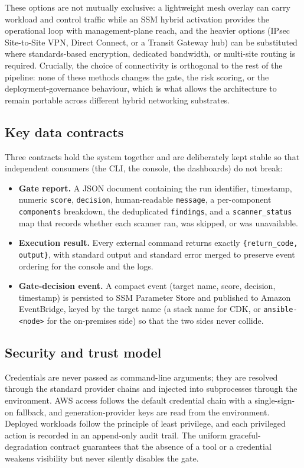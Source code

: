 These options are not mutually exclusive: a lightweight mesh overlay can carry workload
and control traffic while an SSM hybrid activation provides the operational loop with
management-plane reach, and the heavier options (IPsec Site-to-Site VPN, Direct Connect,
or a Transit Gateway hub) can be substituted where standards-based encryption, dedicated
bandwidth, or multi-site routing is required. Crucially, the choice of connectivity is
orthogonal to the rest of the pipeline: none of these methods changes the gate, the risk
scoring, or the deployment-governance behaviour, which is what allows the architecture to
remain portable across different hybrid networking substrates.

\subsection{Key data contracts}
\label{subsec:arch-contracts}

Three contracts hold the system together and are deliberately kept stable so that
independent consumers (the CLI, the console, the dashboards) do not break:

\begin{itemize}
    \item \textbf{Gate report.} A JSON document containing the run identifier,
    timestamp, numeric \texttt{score}, \texttt{decision}, human-readable
    \texttt{message}, a per-component \texttt{components} breakdown, the deduplicated
    \texttt{findings}, and a \texttt{scanner\_status} map that records whether each
    scanner ran, was skipped, or was unavailable.
    \item \textbf{Execution result.} Every external command returns exactly
    \texttt{\{return\_code, output\}}, with standard output and standard error merged to
    preserve event ordering for the console and the logs.
    \item \textbf{Gate-decision event.} A compact event (target name, score, decision,
    timestamp) is persisted to SSM Parameter Store and published to Amazon EventBridge,
    keyed by the target name (a stack name for CDK, or \texttt{ansible-<node>} for the
    on-premises side) so that the two sides never collide.
\end{itemize}

\subsection{Security and trust model}
\label{subsec:arch-trust}

Credentials are never passed as command-line arguments; they are resolved through the
standard provider chains and injected into subprocesses through the environment. AWS
access follows the default credential chain with a single-sign-on fallback, and
generation-provider keys are read from the environment. Deployed workloads follow the
principle of least privilege, and each privileged action is recorded in an append-only
audit trail. The uniform graceful-degradation contract guarantees that the absence of a
tool or a credential weakens visibility but never silently disables the gate.

